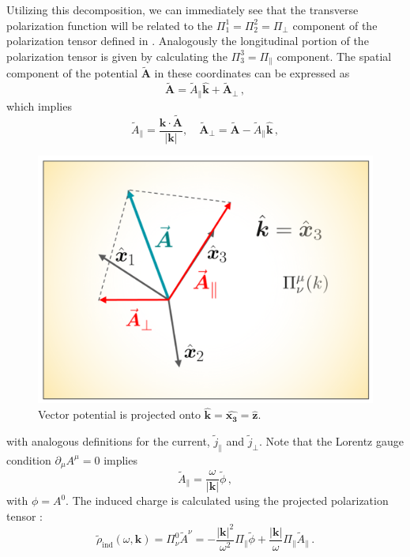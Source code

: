 Utilizing this decomposition, we can immediately see that the transverse polarization function will be related to the $\Pi^1_1 = \Pi^2_2 = \Pi_\perp$ component of the polarization tensor defined in . Analogously the longitudinal portion of the polarization tensor is given by calculating the $\Pi^3_3 = \Pi_\parallel$ component. The spatial component of the potential $\widetilde{\boldsymbol{A}}$  in these coordinates can be expressed as
\begin{equation}
\widetilde{\boldsymbol{A}} = \widetilde{A}_\parallel \hat{\boldsymbol{k}} + \widetilde{\boldsymbol{A}}_\perp\,,
\end{equation}
which implies
\begin{equation}
 \widetilde{A}_{\parallel} = \frac{\boldsymbol{k} \cdot  \widetilde{\boldsymbol{A}}}{|\boldsymbol{k}|}, \quad   \widetilde{\boldsymbol{A}}_{\perp} = \widetilde{\boldsymbol{A}} -  \widetilde{A}_{\parallel}\hat{\boldsymbol{k}}\,,
\end{equation}
\begin{figure}[ht]
    \centering
    \includegraphics[width=0.55\linewidth]{plots/chap01intro/Screenshot 2024-03-14 124133.png}
    \caption{Vector potential is projected onto $\boldsymbol{\hat{k}} = \boldsymbol{\hat{x_3}} =\boldsymbol{\hat{z}}$.}
    \label{fig:project}
\end{figure}
with analogous definitions for the current, $\widetilde{j}_{\parallel}$ and $\widetilde{j}_{\perp}$. Note that the Lorentz gauge condition $\partial_\mu A^\mu = 0$ implies
\begin{equation}\label{eq:apar}
\widetilde{A}_\parallel = \frac{\omega}{ |\boldsymbol{k}|}\widetilde{\phi}\, ,
\end{equation} 
with $\phi=A^0$. The induced charge is calculated using the projected polarization tensor :
\begin{equation}
    \widetilde{\rho}_\text{ind}(\omega,\boldsymbol{k})  = \Pi^0_\nu \widetilde{A}^\nu = -\frac{|\boldsymbol{k}|^2}{\omega^2} \Pi_{\parallel}\widetilde{\phi} +  \frac{|\boldsymbol{k}|}{\omega}\Pi_{\parallel} \widetilde{A}_{\parallel}\,.
\end{equation}

